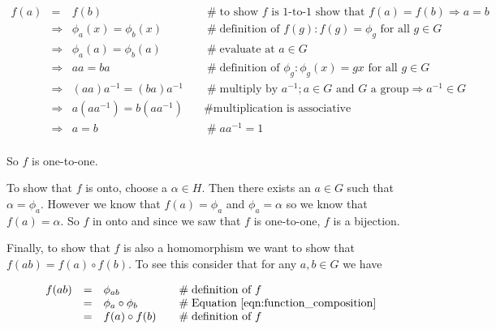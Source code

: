 \documentclass[11pt, oneside]{article}   	%
\theoremstyle{definition}
\begin{document}
\begin{equation*}
\begin{array}{rcll}
f(a)
&=& f(b)                                                  &\quad  \mathrel{\#} \text{to show $f$ is 1-to-1 show that } f(a) = f(b) \Rightarrow a = b \\
&\Rightarrow& \phi_a(x) = \phi_b(x)       &\quad  \mathrel{\#} \text{definition of $f(g): f(g) = \phi_g \text{ for all } g \in G$} \\
&\Rightarrow& \phi_a(a) = \phi_b(a)       &\quad  \mathrel{\#} \text{evaluate at $a \in G$} \\
&\Rightarrow& aa = ba                           &\quad  \mathrel{\#} \text{definition of $\phi_{g}: \phi_{g}(x) = gx  \text{ for all } g \in G$} \\
&\Rightarrow& (aa)a^{-1} = (ba)a^{-1}    &\quad  \mathrel{\#} \text{multiply by $a^{-1}$}; a \in G \text{ and $G$ a group} \Rightarrow a^{-1} \in G \\
&\Rightarrow& a(aa^{-1}) = b(aa^{-1})    &\quad  \mathrel{\#} \text{multiplication is associative}            \\
&\Rightarrow& a = b                               &\quad  \mathrel{\#} aa^{-1} = 1    \\
\end{array}
\end{equation*}

\bigskip
\noindent
So $f$ is one-to-one. 

\bigskip
\noindent
To show that $f$ is onto, choose a $\alpha \in H$. Then there exists an $a \in G$ such that $\alpha = \phi_a$. However we know that 
$f(a) = \phi_a$ and  $\phi_a = \alpha$ so we know that  $f(a) = \alpha$. So $f$ in onto and since we saw that $f$ is one-to-one, $f$ is a bijection.


\bigskip
\noindent
Finally, to show that $f$ is also a homomorphism we want to show that $f(ab) = f(a) \circ f(b)$. To see this consider that for any $a,b \in G$ we have 

\bigskip
\begin{equation*}
\begin{array}{rcll}
f(ab)
&=& \phi_{ab}                          &\quad  \mathrel{\#} \text{definition of $f$}                                           \\
&=& \phi_{a} \circ \phi_{b}       &\quad  \mathrel{\#} \text{Equation  \ref{eqn:function_composition}}   \\
&=& f(a) \circ f(b)                     &\quad  \mathrel{\#} \text{definition of $f$}
\end{array}
\end{equation*}
\end{document}
